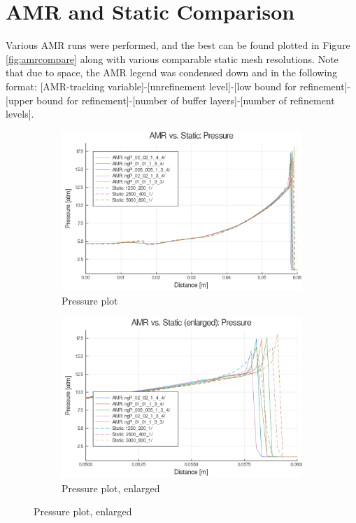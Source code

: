 \section{AMR and Static Comparison}
Various AMR runs were performed, and the best can be found plotted in Figure \ref{fig:amrcompare} along with various comparable static mesh resolutions. Note that due to space, the AMR legend was condensed down and in the following format: [AMR-tracking variable]-[unrefinement level]-[low bound for refinement]-[upper bound for refinement]-[number of buffer layers]-[number of refinement levels]. 
\begin{figure}[]
    \centering
    \begin{subfigure}[]{\textwidth}
        \centering
        \includegraphics[width=\textwidth]{./figs/amrfigs/amrcompare/p.png}
        \caption{Pressure plot}
    \end{subfigure}

    \centering
    \begin{subfigure}[]{\textwidth}
        \centering
        \includegraphics[width=\textwidth]{./figs/amrfigs/amrcompare/pe.png}
        \caption{Pressure plot, enlarged}
    \end{subfigure}

\end{figure}
